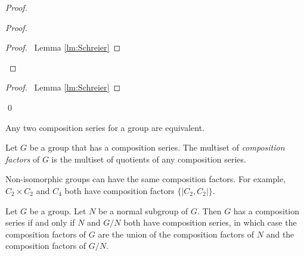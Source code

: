 \begin{proof}
\begin{proof}
	\qedstep
	\begin{proof}
		\pf\ Lemma \ref{lm:Schreier}
	\end{proof}
\end{proof}
\begin{proof}
	\pf\ Lemma \ref{lm:Schreier}
\end{proof}
\qed
\end{proof}

\begin{cor}
Any two composition series for a group are equivalent.
\end{cor}

\begin{df}
Let $G$ be a group that has a composition series. The multiset of \emph{composition factors} of $G$ is the multiset of quotients of any composition series.
\end{df}

\begin{ex}
Non-isomorphic groups can have the same composition factors. For example, $C_2 \times C_2$ and $C_4$ both have composition factors $\{| C_2 , C_2 |\}$.
\end{ex}

\begin{prop}
\label{prop:composition-series-N-GN}
Let $G$ be a group. Let $N$ be a normal subgroup of $G$. Then $G$ has a composition series if and only if $N$ and $G/N$ both have composition series, in which case the composition factors of $G$ are the union of the composition factors of $N$ and the composition factors of $G/N$.
\end{prop}

